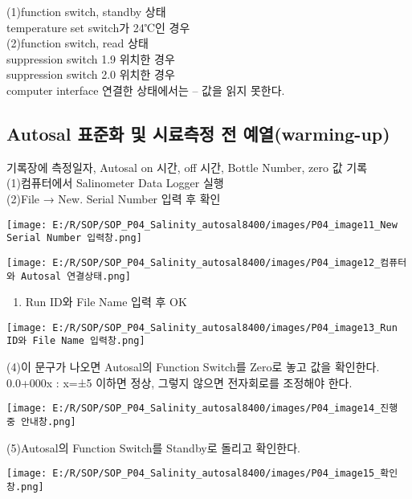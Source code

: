 \documentclass[
]{book}
\providecommand{\tightlist}{%
  \setlength{\itemsep}{0pt}\setlength{\parskip}{0pt}}
\begin{document}
(1)function switch, standby 상태\\
temperature set switch가 24℃인 경우\\
(2)function switch, read 상태\\
suppression switch 1.9 위치한 경우\\
suppression switch 2.0 위치한 경우\\
computer interface 연결한 상태에서는 -- 값을 읽지 못한다.

\hypertarget{autosal-uxd45cuxc900uxd654-uxbc0f-uxc2dcuxb8ccuxce21uxc815-uxc804-uxc608uxc5f4warming-up}{%
\subsection{Autosal 표준화 및 시료측정 전 예열(warming-up)}\label{autosal-uxd45cuxc900uxd654-uxbc0f-uxc2dcuxb8ccuxce21uxc815-uxc804-uxc608uxc5f4warming-up}}

기록장에 측정일자, Autosal on 시간, off 시간, Bottle Number, zero 값 기록\\
(1)컴퓨터에서 Salinometer Data Logger 실행\\
(2)File → New. Serial Number 입력 후 확인

\texttt{[image: E:/R/SOP/SOP\_P04\_Salinity\_autosal8400/images/P04\_image11\_New Serial Number 입력창.png]}

\texttt{[image: E:/R/SOP/SOP\_P04\_Salinity\_autosal8400/images/P04\_image12\_컴퓨터와 Autosal 연결상태.png]}

\begin{enumerate}
\def\labelenumi{(\arabic{enumi})}
\setcounter{enumi}{2}
\tightlist
\item
  Run ID와 File Name 입력 후 OK
\end{enumerate}

\texttt{[image: E:/R/SOP/SOP\_P04\_Salinity\_autosal8400/images/P04\_image13\_Run ID와 File Name 입력창.png]}

(4)이 문구가 나오면 Autosal의 Function Switch를 Zero로 놓고 값을 확인한다. 0.0+000x : x=±5 이하면 정상, 그렇지 않으면 전자회로를 조정해야 한다.

\texttt{[image: E:/R/SOP/SOP\_P04\_Salinity\_autosal8400/images/P04\_image14\_진행 중 안내창.png]}

(5)Autosal의 Function Switch를 Standby로 돌리고 확인한다.

\texttt{[image: E:/R/SOP/SOP\_P04\_Salinity\_autosal8400/images/P04\_image15\_확인창.png]}
\end{document}
